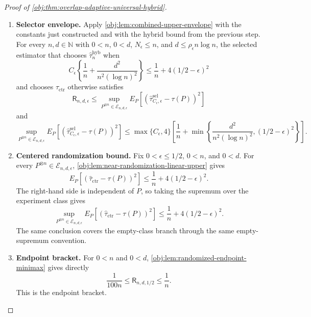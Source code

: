 \documentclass[11pt]{article}
\begin{document}
\begin{proof}[Proof of \cref{obj:thm:overlap-adaptive-universal-hybrid}]
\begin{enumerate}
\item \textbf{Selector envelope.}
Apply \cref{obj:lem:combined-upper-envelope} with the constants just constructed and with the hybrid bound from the previous step.  For every \(n,d\in\mathbb N\) with \(0<n\), \(0<d\), \(N_\epsilon\le n\), and \(d\le\rho_\epsilon n\log n\), the selected estimator that chooses \(\widehat\tau_n^{\mathrm{hyb}}\) when
\[
C_\epsilon\left\{\frac1n+\frac{d^2}{n^2(\log n)^2}\right\}
\le
\frac1n+4(1/2-\epsilon)^2
\]
and chooses \(\widehat\tau_{\mathrm{ctr}}\) otherwise satisfies
\[
\mathsf R_{n,d,\epsilon}
\le
\sup_{P^{\otimes n}\in\mathcal E_{n,d,\epsilon}}
E_P\!\left[
\left(\widehat\tau^{\mathrm{sel}}_{C_\epsilon,\epsilon}-\tau(P)\right)^2
\right]
\]
and
\[
\sup_{P^{\otimes n}\in\mathcal E_{n,d,\epsilon}}
E_P\!\left[
\left(\widehat\tau^{\mathrm{sel}}_{C_\epsilon,\epsilon}-\tau(P)\right)^2
\right]
\le
\max\{C_\epsilon,4\}
\left[
\frac1n+
\min\left\{
\frac{d^2}{n^2(\log n)^2},
(1/2-\epsilon)^2
\right\}
\right].
\]

\item \textbf{Centered randomization bound.}
Fix \(0<\epsilon\le1/2\), \(0<n\), and \(0<d\).  For every \(P^{\otimes n}\in\mathcal E_{n,d,\epsilon}\), \cref{obj:lem:near-randomization-linear-upper} gives
\[
E_P\!\left[
\left(\widehat\tau_{\mathrm{ctr}}-\tau(P)\right)^2
\right]
\le
\frac1n+4(1/2-\epsilon)^2 .
\]
The right-hand side is independent of \(P\), so taking the supremum over the experiment class gives
\[
\sup_{P^{\otimes n}\in\mathcal E_{n,d,\epsilon}}
E_P\!\left[
\left(\widehat\tau_{\mathrm{ctr}}-\tau(P)\right)^2
\right]
\le
\frac1n+4(1/2-\epsilon)^2 .
\]
The same conclusion covers the empty-class branch through the same empty-supremum convention.

\item \textbf{Endpoint bracket.}
For \(0<n\) and \(0<d\), \cref{obj:lem:randomized-endpoint-minimax} gives directly
\[
\frac{1}{100n}
\le
\mathsf R_{n,d,1/2}
\le
\frac1n .
\]
This is the endpoint bracket.
\end{enumerate}
\end{proof}




\end{document}
